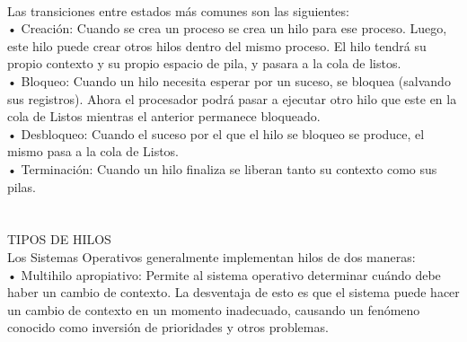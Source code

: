 \documentclass[conference]{IEEEtran}
\begin{document}
\\
Las transiciones entre estados más comunes son las siguientes: 
\\
• Creación: Cuando se crea un proceso se crea un hilo para ese proceso. Luego, este hilo puede crear otros hilos dentro del mismo proceso. El hilo tendrá su propio contexto y su propio espacio de pila, y pasara a la cola de listos. 
\\
• Bloqueo: Cuando un hilo necesita esperar por un suceso, se bloquea (salvando sus registros). Ahora el procesador podrá pasar a ejecutar otro hilo que este en la cola de Listos mientras el anterior permanece bloqueado. 
\\
• Desbloqueo: Cuando el suceso por el que el hilo se bloqueo se produce, el mismo pasa a la cola de Listos. 
\\
• Terminación: Cuando un hilo finaliza se liberan tanto su contexto como sus pilas.
\cite{b3}
\\
\\
\\
TIPOS DE HILOS
\\
Los Sistemas Operativos generalmente implementan hilos de dos maneras:
\\
 • Multihilo apropiativo: Permite al sistema operativo determinar cuándo debe haber un cambio de contexto. La desventaja de esto es que el sistema puede hacer un cambio de contexto en un momento inadecuado, causando un fenómeno conocido como inversión de prioridades y otros problemas. 
 
\end{document}
